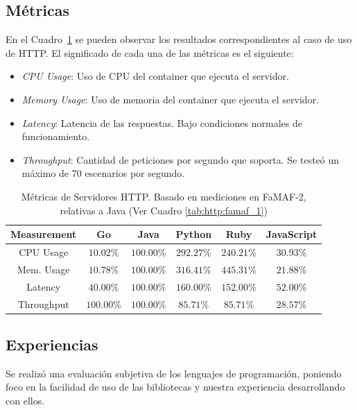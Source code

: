 \documentclass[11pt]{article}
\let\Oldsubsection\subsection
\renewcommand{\subsection}{\FloatBarrier\Oldsubsection}
\newcommand{\technical}[1]{\textit{#1}}
\begin{document}
\subsection{Métricas}

En el Cuadro~\ref{tab:http:metrics} se pueden observar los resultados correspondientes al caso de uso de HTTP. El significado de cada una de las métricas es el siguiente:

\begin{itemize}
    \item \technical{CPU Usage}: Uso de CPU del container que ejecuta el servidor.
    \item \technical{Memory Usage}: Uso de memoria del container que ejecuta el servidor.
    \item \technical{Latency}: Latencia de las respuestas. Bajo condiciones normales de funcionamiento.
    \item \technical{Throughput}: Cantidad de peticiones por segundo que soporta. Se testeó un máximo de 70 escenarios por segundo.
\end{itemize}

\begin{table}[h]
\centering
\begin{tabular}{|c|c|c|c|c|c|}
\hline
Measurement & Go       & Java     & Python   & Ruby     & JavaScript \\ \hline
CPU Usage   & $10.02$\%  & $100.00$\% & $292.27$\% & $240.21$\% & $30.93$\%    \\ \hline
Mem. Usage  & $10.78$\%  & $100.00$\% & $316.41$\% & $445.31$\% & $21.88$\%    \\ \hline
Latency     & $40.00$\%  & $100.00$\% & $160.00$\% & $152.00$\% & $52.00$\%    \\ \hline
Throughput  & $100.00$\% & $100.00$\% & $85.71$\%  & $85.71$\%  & $28.57$\%    \\ \hline
\end{tabular}
\caption{Métricas de Servidores HTTP. Basado en mediciones en FaMAF-2, relativas a Java (Ver Cuadro \ref{tab:http:famaf_1})}
\label{tab:http:metrics}
\end{table}

\subsection{Experiencias}

Se realizó una evaluación subjetiva de los lenguajes de programación, poniendo foco en la facilidad de uso de las bibliotecas y nuestra experiencia desarrollando con ellos.
\end{document}
